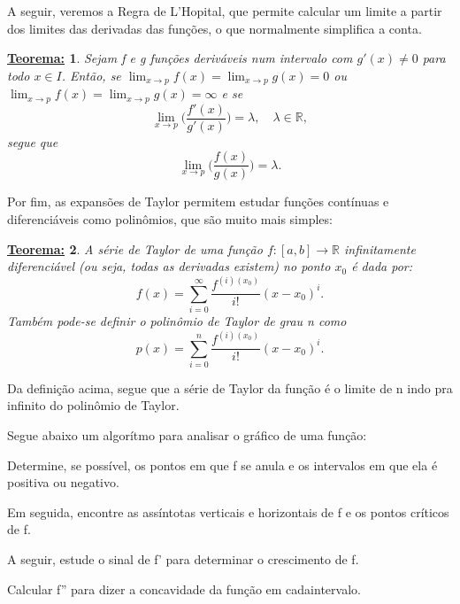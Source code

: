 \documentclass{article}
\newtheorem*{thm*}{\underline{Teorema:}}
\begin{document}
    A seguir, veremos a Regra de L'Hopital, que permite calcular um limite a partir dos limites das derivadas das fun\c c\~oes, o que normalmente simplifica a conta.
    \begin{thm*}
        Sejam f e g fun\c c\~oes deriv\'aveis num intervalo com $g'(x)\neq0$ para todo $x\in{I}$. Ent\~ao, se $\lim_{x\to{p}}f(x) = \lim_{x\to{p}}g(x) = 0$ ou 
        $\lim_{x\to{p}}f(x) = \lim_{x\to{p}}g(x) = \infty$ e se 
        $$
            \lim_{x\to{p}}\biggl(\frac{f'(x)}{g'(x)}\biggr) = \lambda, \quad\lambda\in\mathbb{R},
        $$
        segue que 
        $$ 
            \lim_{x\to{p}}\biggl(\frac{f(x)}{g(x)}\biggr) = \lambda.
        $$
    \end{thm*}
    
    Por fim, as expans\~oes de Taylor permitem estudar fun\c c\~oes cont\'inuas e diferenci\'aveis como polin\^omios, que s\~ao muito mais simples:
    \begin{thm*}
        A s\'erie de Taylor de uma fun\c c\~ao $f:[a, b]\rightarrow\mathbb{R}$ infinitamente diferenci\'avel (ou seja, todas as derivadas existem) no ponto $x_0$ \'e
        dada por:
        $$
            f(x) = \sum_{i=0}^{\infty}\frac{f^{(i)(x_0)}}{i!}(x-x_0)^i.
        $$
        Tamb\'em pode-se definir o polin\^omio de Taylor de grau n como
        $$
            p(x) = \sum_{i=0}^{n}\frac{f^{(i)(x_0)}}{i!}(x-x_0)^i.
        $$
    \end{thm*}
    Da defini\c c\~ao acima, segue que a s\'erie de Taylor da fun\c c\~ao \'e o limite de n indo pra infinito do polin\^omio de Taylor.\vspace{0.5cm}

    Segue abaixo um algor\'itmo para analisar o gr\'afico de uma fun\c c\~ao:

    Determine, se poss\'ivel, os pontos em que f se anula e os intervalos em que ela \'e positiva ou negativo. 
    
    Em seguida, encontre as ass\'intotas verticais e horizontais
    de f e os pontos cr\'iticos de f. 
    
    A seguir, estude o sinal de f' para determinar o crescimento de f. 
    
    Calcular f'' para dizer a concavidade da fun\c c\~ao em cadaintervalo.
\end{document}
